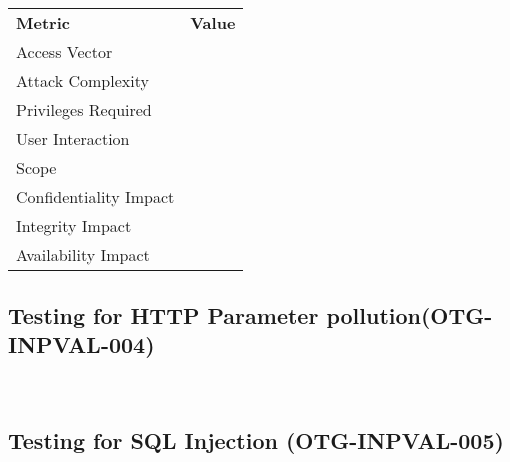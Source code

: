 \documentclass[headsepline,footsepline,footinclude=false,oneside,fontsize=11pt,paper=a4,listof=totoc,bibliography=totoc]{scrbook} %
\begin{document}
\\
\vspace{0.5cm}
\\
\begin{center}
	\begin{tabular}{ll}
		\rowcolor[HTML]{34CDF9} 
		{\color[HTML]{ECF4FF} \textbf{Metric}}        & {\color[HTML]{ECF4FF} \textbf{Value}} \\
		\rowcolor[HTML]{BBDAFF} 
		{\color[HTML]{333333} Access Vector}          & {\color[HTML]{333333} }               \\
		\rowcolor[HTML]{ECF4FF} 
		{\color[HTML]{333333} Attack Complexity}      & {\color[HTML]{333333} }               \\
		\rowcolor[HTML]{BBDAFF} 
		{\color[HTML]{333333} Privileges Required}    & {\color[HTML]{333333} }               \\
		\rowcolor[HTML]{ECF4FF} 
		{\color[HTML]{333333} User Interaction}       & {\color[HTML]{333333} }               \\
		\rowcolor[HTML]{BBDAFF} 
		{\color[HTML]{333333} Scope}                  & {\color[HTML]{333333} }               \\
		\rowcolor[HTML]{ECF4FF} 
		{\color[HTML]{333333} Confidentiality Impact} & {\color[HTML]{333333} }               \\
		\rowcolor[HTML]{BBDAFF} 
		{\color[HTML]{333333} Integrity Impact}       & {\color[HTML]{333333} }               \\
		\rowcolor[HTML]{ECF4FF} 
		{\color[HTML]{333333} Availability Impact}    & {\color[HTML]{333333} }              
	\end{tabular}
\end{center}

\pagebreak 
\subsection{Testing for HTTP Parameter pollution(OTG-INPVAL-004)}\
\pagebreak 
\subsection{Testing for SQL Injection  (OTG-INPVAL-005)}\
\pagebreak 
\end{document}
